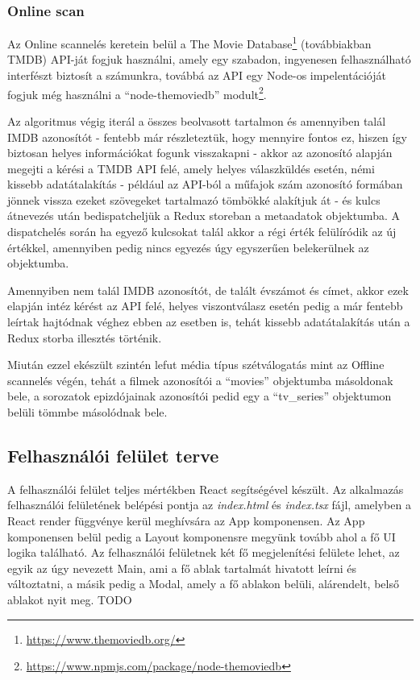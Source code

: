 \subsubsection{Online scan}
Az Online scannelés keretein belül a The Movie Database\footnote{\url{https://www.themoviedb.org/}} (továbbiakban TMDB) API-ját fogjuk használni, amely egy szabadon, ingyenesen felhasználható interfészt biztosít a számunkra, továbbá az API egy Node-os impelentációját fogjuk még használni a ``node-themoviedb'' modult\footnote{\url{https://www.npmjs.com/package/node-themoviedb}}.

Az algoritmus végig iterál a összes beolvasott tartalmon és amennyiben talál IMDB azonosítót - fentebb már részleteztük, hogy mennyire fontos ez, hiszen így biztosan helyes információkat fogunk visszakapni - akkor az azonosító alapján megejti a kérési a TMDB API felé, amely helyes válaszküldés esetén, némi kissebb adatátalakítás - például az API-ból a műfajok szám azonosító formában jönnek vissza ezeket szövegeket tartalmazó tömbökké alakítjuk át - és kulcs átnevezés után bedispatcheljük a Redux storeban a metaadatok objektumba. A dispatchelés során ha egyező kulcsokat talál akkor a régi érték felülíródik az új értékkel, amennyiben pedig nincs egyezés úgy egyszerűen belekerülnek az objektumba.

Amennyiben nem talál IMDB azonosítót, de talált évszámot és címet, akkor ezek elapján intéz kérést az API felé, helyes viszontválasz esetén pedig a már fentebb leírtak hajtódnak véghez ebben az esetben is, tehát kissebb adatátalakítás után a Redux storba illesztés történik.

Miután ezzel ekészült szintén lefut média típus szétválogatás mint az Offline scannelés végén, tehát a filmek azonosítói a ``movies'' objektumba másoldonak bele, a sorozatok epizdójainak azonosítói pedid egy a ``tv\_series'' objektumon belüli tömmbe másolódnak bele.

\subsection{Felhasználói felület terve}
A felhasználói felület teljes mértékben React segítségével készült. Az alkalmazás felhasználói felületének belépési pontja az {\it index.html} és {\it index.tsx} fájl, amelyben a React render függvénye kerül meghívsára az App komponensen. Az App komponensen belül pedig a Layout komponensre megyünk tovább ahol a fő UI logika található.
Az felhasználói felületnek két fő megjelenítési felülete lehet, az egyik az úgy nevezett Main, ami a fő ablak tartalmát hivatott leírni és változtatni, a másik pedig a Modal, amely a fő ablakon belüli, alárendelt, belső ablakot nyit meg.
TODO

